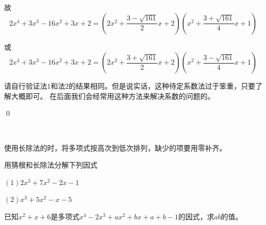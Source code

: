 \begin{jie}
\begin{way2}
    故\[2x^4+3x^3-16x^2+3x+2=(2x^2+\frac{3-\sqrt{161}}{2}x+2)(x^2+\frac{3+\sqrt{161}}{4}x+1)\]

    或\[2x^4+3x^3-16x^2+3x+2=(2x^2+\frac{3+\sqrt{161}}{2}x+2)(x^2+\frac{3-\sqrt{161}}{4}x+1)\]
\end{way2}
    请自行验证法$1$和法$2$的结果相同。但是说实话，这种待定系数法过于笨重，只要了解大概即可。
    在后面我们会经常用这种方法来解决系数的问题的。

    \qed
\end{jie}

\

\begin{att}
使用长除法的时，将多项式按高次到低次排列，缺少的项要用零补齐。
\end{att}
\begin{exercise}
    用猜根和长除法分解下列因式

    $(1)2x^3+7x^2-2x-1$

    $(2)x^3+5x^2-x-5$
\end{exercise}
\begin{exercise}
    已知$x^2+x+6$是多项式$x^4-2x^3+ax^2+bx+a+b-1$的因式，求$ab$的值。
\end{exercise}

\clearpage

\hw

